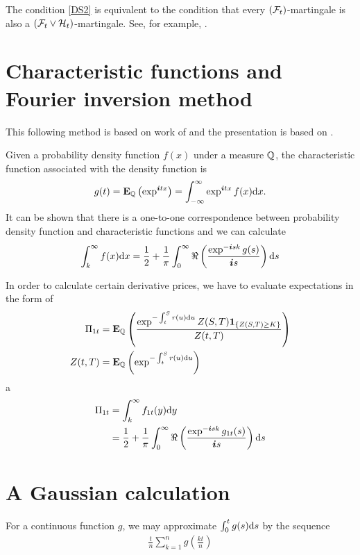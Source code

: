 The condition \ref{DS2} is equivalent to the condition that every $(\mathcal{F}_t)$-martingale is also a $(\mathcal{F}_t \vee \mathcal{H}_t)$-martingale. See, for example, \cite{filipovic2009term}.

\section{Characteristic functions and Fourier inversion method}

This following method is based on work of \textcite{heston1993closed} and the presentation is based on \textcite[pp. 222--233]{nawalkabeliaevasoto2007dynamic}.

Given a probability density function $f(x)$ under a measure $\mathbb{Q}$, the characteristic function associated with the density function is
  \begin{align}
    g(t) = \operatorname{\boldsymbol{\mathrm{E}}}_{\mathbb{Q}} \left( \exp^{\boldsymbol{i}tx} \right) = \int_{-\infty}^{\infty} \exp^{\boldsymbol{i}tx} f(x) \mathrm{d} x .
  \end{align}
It can be shown that there is a one-to-one correspondence between probability density function and characteristic functions and we can calculate
  \begin{align}
    \int_k^{\infty} f(x) \mathrm{d} x = \frac{1}{2} + \frac{1}{\pi} \int_0^{\infty} \Re \left( \frac{\exp^{-\boldsymbol{i}sk} g(s)}{\boldsymbol{i} s} \right) \mathrm{d} s
  \end{align}

In order to calculate certain derivative prices, we have to evaluate expectations in the form of
  \begin{align}
    \Pi_{1t} &= \operatorname{\boldsymbol{\mathrm{E}}}_{\mathbb{Q}} \left( \frac{\exp^{-\int_t^S r(u) \mathrm{d} u}Z(S,T) \boldsymbol{1}_{ \{ Z(S,T) \geq K \} } }{Z(t,T)} \right) \\
     Z(t,T) &= \operatorname{\boldsymbol{\mathrm{E}}}_{\mathbb{Q}} \left( \exp^{-\int_t^S r(u) \mathrm{d} u} \right)
  \end{align}
a
  \begin{align}
    \Pi_{1t} &= \int_k^{\infty} f_{1t} (y) \mathrm{d} y \\
    &= \frac{1}{2} + \frac{1}{\pi} \int_0^{\infty} \Re \left( \frac{\exp^{-\boldsymbol{i}sk} g_{1t}(s)}{\boldsymbol{i} s} \right) \mathrm{d} s
  \end{align}

\section{A Gaussian calculation}

For a continuous function $g$, we may approximate $\int_0^t g(s) \mathrm{d} s$ by the sequence
  \begin{align}
    \frac{t}{n} \sum_{k=1}^n g \left( \frac{kt}{n} \right)
  \end{align}

